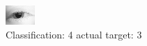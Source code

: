 \begin{figure}[h!]
\begin{center}
\includegraphics[width=0.60\columnwidth]{figures/ID2_class_4_target_3.png}
\end{center}
\caption{ Classification: 4 actual target: 3}
\label{fig:ID2_class_4_target_3}
\end{figure}
